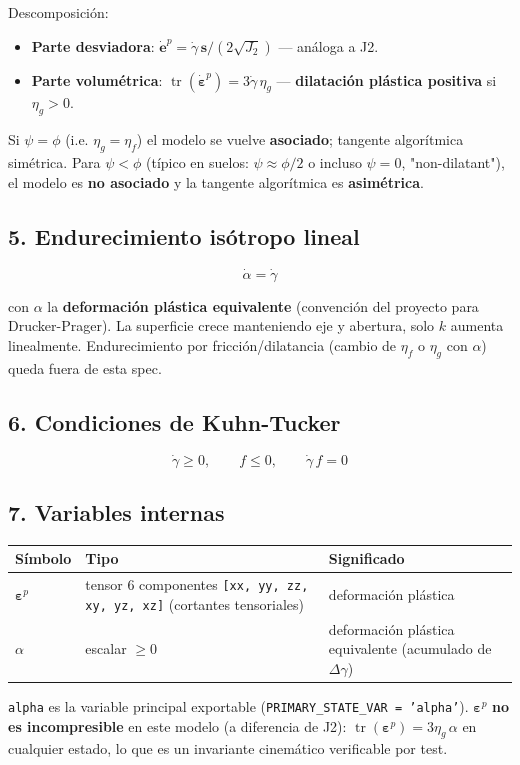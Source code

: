 \documentclass[11pt,letterpaper,oneside]{report}
\begin{document}
Descomposición:

\begin{itemize}
  \item \textbf{Parte desviadora}: $\dot{\mathbf e}^p = \dot\gamma\,\mathbf s/(2\sqrt{J_2})$ --- análoga a J2.
  \item \textbf{Parte volumétrica}: $\operatorname{tr}(\dot{\boldsymbol\varepsilon}^p) = 3\dot\gamma\,\eta_g$ --- \textbf{dilatación plástica positiva} si $\eta_g > 0$.
\end{itemize}

Si $\psi = \phi$ (i.e. $\eta_g = \eta_f$) el modelo se vuelve \textbf{asociado}; tangente algorítmica simétrica. Para $\psi < \phi$ (típico en suelos: $\psi \approx \phi/2$ o incluso $\psi = 0$, "non-dilatant"), el modelo es \textbf{no asociado} y la tangente algorítmica es \textbf{asimétrica}.

\subsection{5. Endurecimiento isótropo lineal}

\[
\dot\alpha = \dot\gamma
\]

con $\alpha$ la \textbf{deformación plástica equivalente} (convención del proyecto para Drucker-Prager). La superficie crece manteniendo eje y abertura, solo $k$ aumenta linealmente. Endurecimiento por fricción/dilatancia (cambio de $\eta_f$ o $\eta_g$ con $\alpha$) queda fuera de esta spec.

\subsection{6. Condiciones de Kuhn-Tucker}

\[
\dot\gamma \geq 0,\qquad f \leq 0,\qquad \dot\gamma\,f = 0
\]

\subsection{7. Variables internas}

\begin{center}
\begin{tabularx}{\textwidth}{YYY}
\hline
\textbf{Símbolo} & \textbf{Tipo} & \textbf{Significado} \\
\hline
$\boldsymbol\varepsilon^p$ & tensor 6 componentes \texttt{[xx, yy, zz, xy, yz, xz]} (cortantes tensoriales) & deformación plástica \\
$\alpha$ & escalar $\geq 0$ & deformación plástica equivalente (acumulado de $\Delta\gamma$) \\
\hline
\end{tabularx}
\end{center}
\texttt{alpha} es la variable principal exportable (\texttt{PRIMARY\_STATE\_VAR = 'alpha'}). $\boldsymbol\varepsilon^p$ \textbf{no es incompresible} en este modelo (a diferencia de J2): $\operatorname{tr}(\boldsymbol\varepsilon^p) = 3\eta_g\,\alpha$ en cualquier estado, lo que es un invariante cinemático verificable por test.
\end{document}
